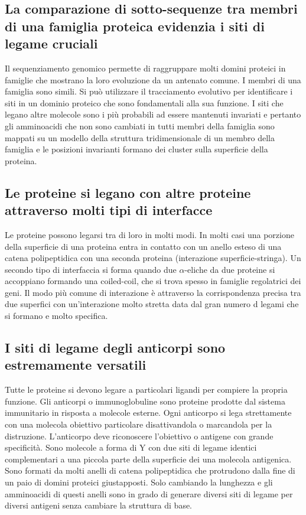\subsection{La comparazione di sotto-sequenze tra membri di una famiglia proteica evidenzia i siti di legame cruciali}
Il sequenziamento genomico permette di raggruppare molti domini proteici in famiglie che mostrano la loro evoluzione da un antenato comune. I membri di una famiglia sono simili. Si 
pu\`o utilizzare il tracciamento evolutivo per identificare i siti in un dominio proteico che sono fondamentali alla sua funzione. I siti che legano altre molecole sono i pi\`u 
probabili ad essere mantenuti invariati e pertanto gli amminoacidi che non sono cambiati in tutti membri della famiglia sono mappati su un modello della struttura tridimensionale di 
un membro della famiglia e le posizioni invarianti formano dei cluster sulla superficie della proteina. 
\subsection{Le proteine si legano con altre proteine attraverso molti tipi di interfacce}
Le proteine possono legarsi tra di loro in molti modi. In molti casi una porzione della superficie di una proteina entra in contatto con un anello esteso di una catena polipeptidica con 
una seconda proteina (interazione superficie-stringa). Un secondo tipo di interfaccia si forma quando due $\alpha$-eliche da due proteine si accoppiano formando una coiled-coil, che
si trova spesso in famiglie regolatrici dei geni. Il modo pi\`u comune di interazione \`e attraverso la corrispondenza precisa tra due superfici con un'interazione molto stretta data dal
gran numero d legami che si formano e molto specifica. 
\subsection{I siti di legame degli anticorpi sono estremamente versatili}
Tutte le proteine si devono legare a particolari ligandi per compiere la propria funzione. Gli anticorpi o immunoglobuline sono proteine prodotte dal sistema immunitario in risposta
a molecole esterne. Ogni anticorpo si lega strettamente con una molecola obiettivo particolare disattivandola o marcandola per la distruzione. L'anticorpo deve riconoscere l'obiettivo
o antigene con grande specificit\`a. Sono molecole a forma di Y con due siti di legame identici complementari a una piccola parte della superficie dei una molecola antigenica. Sono
formati da molti anelli di catena polipeptidica che protrudono dalla fine di un paio di domini proteici giustapposti. Solo cambiando la lunghezza e gli amminoacidi di questi anelli sono
in grado di generare diversi siti di legame per diversi antigeni senza cambiare la struttura di base. 
